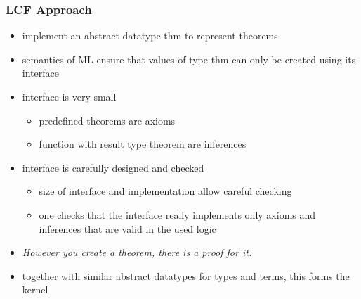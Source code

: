 \begin{frame}
\frametitle{LCF Approach}

\begin{itemize}
\item implement an abstract datatype \alert{thm} to represent theorems
\item semantics of ML ensure that values of type thm can only be created using its interface
\item interface is very small
\begin{itemize}
\item predefined theorems are axioms
\item function with result type theorem are inferences
\end{itemize}
\item interface is carefully designed and checked
\begin{itemize}
\item size of interface and implementation allow careful checking
\item one checks that the interface really implements only axioms and inferences that are valid in the used logic
\end{itemize}
\item \emph{However you create a theorem, there is a proof for it.}
\item together with similar abstract datatypes for types and terms, this forms the \alert{kernel}
\end{itemize}
\end{frame}


